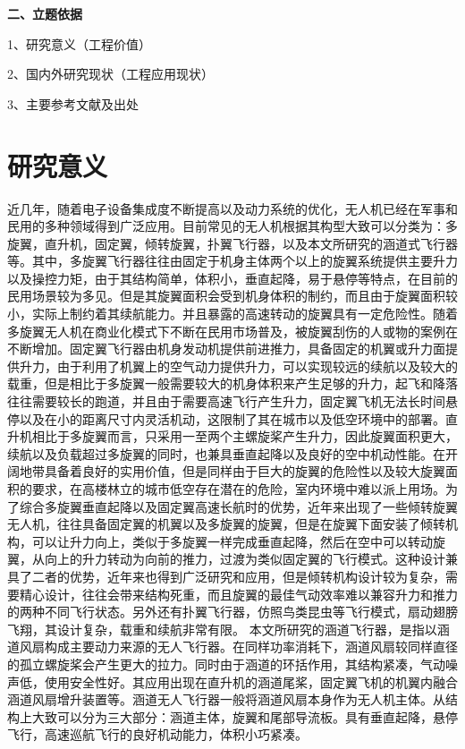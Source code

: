 \textbf{\fangsong\xiaosihao 二、立题依据}
\begin{ubox}
	\setlength{\parindent}{0em} 
1、研究意义（工程价值）
\vspace{-0.25cm}

2、国内外研究现状（工程应用现状）
\vspace{-0.25cm}

3、主要参考文献及出处
\setlength{\parindent}{2em} 
\section{研究意义}
近几年，随着电子设备集成度不断提高以及动力系统的优化，无人机已经在军事和民用的多种领域得到广泛应用。目前常见的无人机根据其构型大致可以分类为：多旋翼，直升机，固定翼，倾转旋翼，扑翼飞行器，以及本文所研究的涵道式飞行器等。其中，多旋翼飞行器往往由固定于机身主体两个以上的旋翼系统提供主要升力以及操控力矩，由于其结构简单，体积小，垂直起降，易于悬停等特点，在目前的民用场景较为多见。但是其旋翼面积会受到机身体积的制约，而且由于旋翼面积较小，实际上制约着其续航能力。并且暴露的高速转动的旋翼具有一定危险性。随着多旋翼无人机在商业化模式下不断在民用市场普及，被旋翼刮伤的人或物的案例在不断增加。固定翼飞行器由机身发动机提供前进推力，具备固定的机翼或升力面提供升力，由于利用了机翼上的空气动力提供升力，可以实现较远的续航以及较大的载重，但是相比于多旋翼一般需要较大的机身体积来产生足够的升力，起飞和降落往往需要较长的跑道，并且由于需要高速飞行产生升力，固定翼飞机无法长时间悬停以及在小的距离尺寸内灵活机动，这限制了其在城市以及低空环境中的部署。直升机相比于多旋翼而言，只采用一至两个主螺旋桨产生升力，因此旋翼面积更大，续航以及负载超过多旋翼的同时，也兼具垂直起降以及良好的空中机动性能。在开阔地带具备着良好的实用价值，但是同样由于巨大的旋翼的危险性以及较大旋翼面积的要求，在高楼林立的城市低空存在潜在的危险，室内环境中难以派上用场。为了综合多旋翼垂直起降以及固定翼高速长航时的优势，近年来出现了一些倾转旋翼无人机，往往具备固定翼的机翼以及多旋翼的旋翼，但是在旋翼下面安装了倾转机构，可以让升力向上，类似于多旋翼一样完成垂直起降，然后在空中可以转动旋翼，从向上的升力转动为向前的推力，过渡为类似固定翼的飞行模式。这种设计兼具了二者的优势，近年来也得到广泛研究和应用，但是倾转机构设计较为复杂，需要精心设计，往往会带来结构死重，而且旋翼的最佳气动效率难以兼容升力和推力的两种不同飞行状态。另外还有扑翼飞行器，仿照鸟类昆虫等飞行模式，扇动翅膀飞翔，其设计复杂，载重和续航非常有限。
本文所研究的涵道飞行器，是指以涵道风扇构成主要动力来源的无人飞行器。在同样功率消耗下，涵道风扇较同样直径的孤立螺旋桨会产生更大的拉力。同时由于涵道的环括作用，其结构紧凑，气动噪声低，使用安全性好。其应用出现在直升机的涵道尾桨，固定翼飞机的机翼内融合涵道风扇增升装置等。涵道无人飞行器一般将涵道风扇本身作为无人机主体。从结构上大致可以分为三大部分：涵道主体，旋翼和尾部导流板。具有垂直起降，悬停飞行，高速巡航飞行的良好机动能力，体积小巧紧凑。


\end{ubox}

